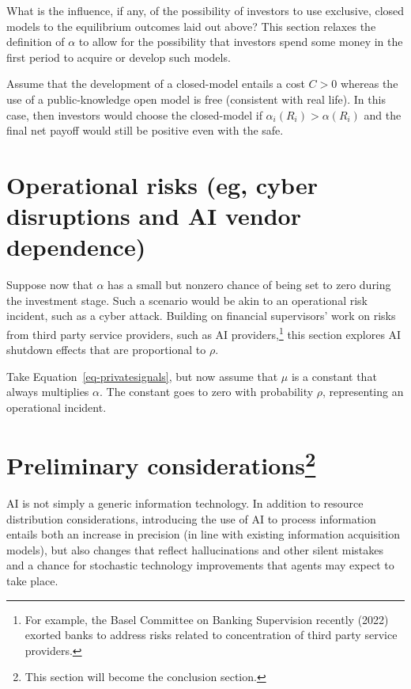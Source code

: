 \documentclass[
]{article}
\theoremstyle{definition}
\theoremstyle{plain}
\theoremstyle{remark}
\begin{document}
What is the influence, if any, of the possibility of investors to use
exclusive, closed models to the equilibrium outcomes laid out above?
This section relaxes the definition of \(\alpha\) to allow for the
possibility that investors spend some money in the first period to
acquire or develop such models.

Assume that the development of a closed-model entails a cost \(C > 0\)
whereas the use of a public-knowledge open model is free (consistent
with real life). In this case, then investors would choose the
closed-model if \(\alpha_i(R_i) > \alpha(R_i)\) and the final net payoff
would still be positive even with the safe.

\section{Operational risks (eg, cyber disruptions and AI vendor
dependence)}\label{operational-risks-eg-cyber-disruptions-and-ai-vendor-dependence}

Suppose now that \(\alpha\) has a small but nonzero chance of being set
to zero during the investment stage. Such a scenario would be akin to an
operational risk incident, such as a cyber attack. Building on financial
supervisors' work on risks from third party service providers, such as
AI providers,\footnote{For example, the Basel Committee on Banking
  Supervision recently (2022) exorted banks to address risks related to
  concentration of third party service providers.} this section explores
AI shutdown effects that are proportional to \(\rho\).

Take Equation~\ref{eq-privatesignals}, but now assume that \(\mu\) is a
constant that always multiplies \(\alpha\). The constant goes to zero
with probability \(\rho\), representing an operational incident.

\section[Preliminary considerations]{\texorpdfstring{Preliminary
considerations\footnote{This section will become the conclusion section.}}{Preliminary considerations}}\label{preliminary-considerationsconcl}

AI is not simply a generic information technology. In addition to
resource distribution considerations, introducing the use of AI to
process information entails both an increase in precision (in line with
existing information acquisition models), but also changes that reflect
hallucinations and other silent mistakes and a chance for stochastic
technology improvements that agents may expect to take place.
\end{document}
